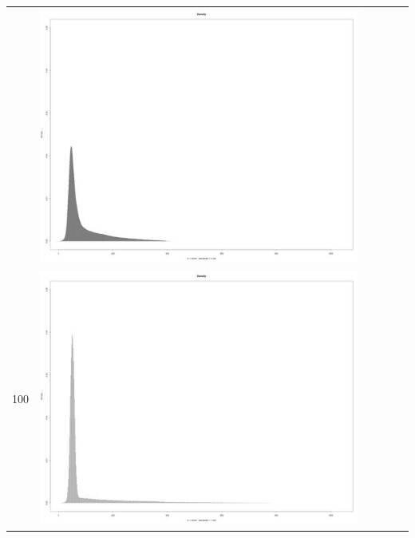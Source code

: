 \begin{table}[htbp]
{\begin{tabular}{l | ccccc}
\begin{minipage}{.15\textwidth}
    				\end{minipage}
    			   & \begin{minipage}{.15\textwidth}\vspace{2pt}     							
     			 	\includegraphics[width=\linewidth]{images/mema-dens-graph/N6}
    				 \end{minipage}\\		
		100	   & \begin{minipage}{.15\textwidth}\vspace{2pt}     							
     			 	\includegraphics[width=\linewidth]{images/mema-dens-graph/N3}
    				 \end{minipage}

\end{tabular}}
\end{table}
